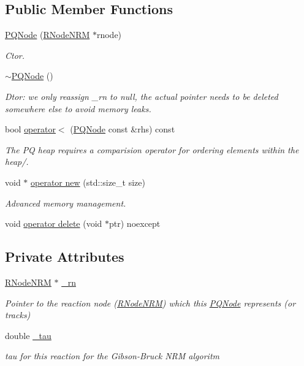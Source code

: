 \subsection*{Public Member Functions}
\begin{DoxyCompactItemize}
\item 
\hyperlink{classchem_1_1PQNode_a216292a150c44b3f2bfeca4518663663}{P\-Q\-Node} (\hyperlink{classchem_1_1RNodeNRM}{R\-Node\-N\-R\-M} $\ast$rnode)
\begin{DoxyCompactList}\small\item\em Ctor. \end{DoxyCompactList}\item 
\hyperlink{classchem_1_1PQNode_a12604503b292d71658be54c9952afcbd}{$\sim$\-P\-Q\-Node} ()
\begin{DoxyCompactList}\small\item\em Dtor\-: we only reassign \-\_\-rn to null, the actual pointer needs to be deleted somewhere else to avoid memory leaks. \end{DoxyCompactList}\item 
bool \hyperlink{classchem_1_1PQNode_a0ba52697bcbc5b2c4accb7dece0aff24}{operator$<$} (\hyperlink{classchem_1_1PQNode}{P\-Q\-Node} const \&rhs) const 
\begin{DoxyCompactList}\small\item\em The P\-Q heap requires a comparision operator for ordering elements within the heap/. \end{DoxyCompactList}\item 
void $\ast$ \hyperlink{classchem_1_1PQNode_a1364ee21435946152266840256b8dd3f}{operator new} (std\-::size\-\_\-t size)
\begin{DoxyCompactList}\small\item\em Advanced memory management. \end{DoxyCompactList}\item 
void \hyperlink{classchem_1_1PQNode_af127d116cdefe86ba41005ef691affc1}{operator delete} (void $\ast$ptr) noexcept
\end{DoxyCompactItemize}
\subsection*{Private Attributes}
\begin{DoxyCompactItemize}
\item 
\hyperlink{classchem_1_1RNodeNRM}{R\-Node\-N\-R\-M} $\ast$ \hyperlink{classchem_1_1PQNode_ae0ddd94f908ec800ae02f592e83c630d}{\-\_\-rn}
\begin{DoxyCompactList}\small\item\em Pointer to the reaction node (\hyperlink{classchem_1_1RNodeNRM}{R\-Node\-N\-R\-M}) which this \hyperlink{classchem_1_1PQNode}{P\-Q\-Node} represents (or tracks) \end{DoxyCompactList}\item 
double \hyperlink{classchem_1_1PQNode_a77a83fe486c496c3e4bd4ffa72d8fb57}{\-\_\-tau}
\begin{DoxyCompactList}\small\item\em tau for this reaction for the Gibson-\/\-Bruck N\-R\-M algoritm \end{DoxyCompactList}\end{DoxyCompactItemize}
